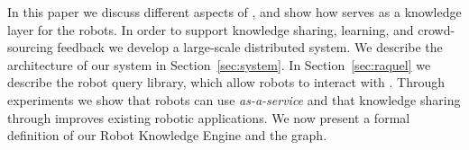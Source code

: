 In this paper we discuss different aspects of \robobrain{}, and show how \robobrain{} serves as a knowledge layer for the robots. In order to support knowledge sharing, learning, and crowd-sourcing feedback we develop a large-scale distributed system. We describe the architecture of our  system in Section~\ref{sec:system}. In Section~\ref{sec:raquel} we describe the robot query library, which allow robots to interact with \robobrain{}.  Through experiments we show that robots can use \robobrain{} \textit{as-a-service} and that knowledge sharing through \robobrain{} improves existing robotic applications. We now present a formal definition of our Robot Knowledge Engine and the graph.
